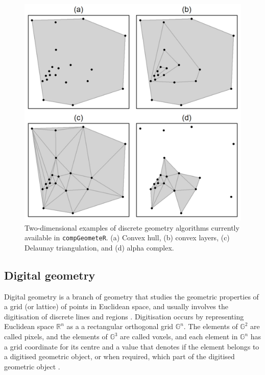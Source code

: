 \documentclass[12pt, a4paper]{article}
\begin{document}
\begin{figure}[ht]
\centering
\includegraphics{figures/figure-1/figure-1.png}
\caption{Two-dimensional examples of discrete geometry algorithms currently available in \texttt{compGeometeR}. (a) Convex hull, (b) convex layers, (c) Delaunay triangulation, and (d) alpha complex.}
\label{fig:euclidean-algorithms}
\end{figure}


\subsection{Digital geometry}

Digital geometry is a branch of geometry that studies the geometric properties of a grid (or lattice) of points in Euclidean space, and usually involves the digitisation of discrete lines and regions \citep{rosenfeld-1989}.  Digitisation occurs by representing Euclidean space $\mathbb{R}^n$ as a a rectangular orthogonal grid $\mathbb{G}^n$.  The elements of $\mathbb{G}^2$ are called pixels, and the elements of $\mathbb{G}^3$ are called voxels, and each element in $\mathbb{G}^n$ has a grid coordinate for its centre \citep{klette-2004} and a value that denotes if the element belongs to a digitised geometric object, or when required, which part of the digitised geometric object .
\end{document}
